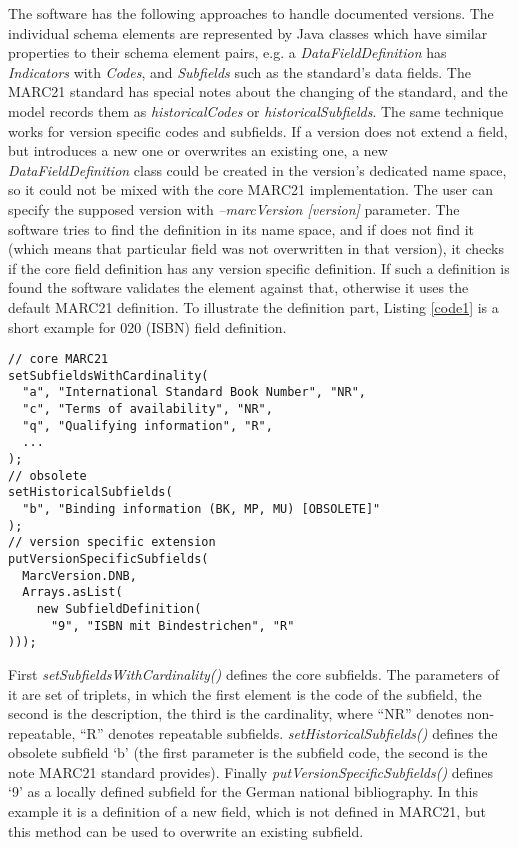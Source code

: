 The software has the following approaches to handle documented versions. The individual schema elements are represented by Java classes which have similar properties to their schema element pairs, e.g. a \emph{DataFieldDefinition} has \emph{Indicators} with \emph{Codes}, and \emph{Subfields} such as the standard's data fields. The MARC21 standard has special notes about the changing of the standard, and the model records them as \emph{historicalCodes} or \emph{historicalSubfields}. The same technique works for version specific codes and subfields. If a version does not extend a field, but introduces a new one or overwrites an existing one, a new \emph{DataFieldDefinition} class could be created in the version's dedicated name space, so it could not be mixed with the core MARC21 implementation. The user can specify the supposed version with \emph{--marcVersion [version]} parameter. The software tries to find the definition in its name space, and if does not find it (which means that particular field was not overwritten in that version), it checks if the core field definition has any version specific definition. If such a definition is found the software validates the element against that, otherwise it uses the default MARC21 definition. To illustrate the definition part, Listing \ref{code1} is a short example for 020 (ISBN) field definition.

\lstset{language=Java, basicstyle=\footnotesize\ttfamily}

\begin{lstlisting}[float, caption=Subfield definition in Java, label=code1]
// core MARC21
setSubfieldsWithCardinality(
  "a", "International Standard Book Number", "NR",
  "c", "Terms of availability", "NR",
  "q", "Qualifying information", "R",
  ...
);
// obsolete
setHistoricalSubfields(
  "b", "Binding information (BK, MP, MU) [OBSOLETE]"
);
// version specific extension
putVersionSpecificSubfields(
  MarcVersion.DNB,
  Arrays.asList(
    new SubfieldDefinition(
      "9", "ISBN mit Bindestrichen", "R"
)));
\end{lstlisting}

First \emph{setSubfieldsWithCardinality()} defines the core subfields. The parameters of it are set of triplets, in which the first element is the code of the subfield, the second is the description, the third is the cardinality, where ``NR'' denotes non-repeatable, ``R'' denotes repeatable subfields. \emph{setHistoricalSubfields()} defines the obsolete subfield `b' (the first parameter is the subfield code, the second is the note MARC21 standard provides). Finally \emph{putVersionSpecificSubfields()} defines `9' as a locally defined subfield for the German national bibliography. In this example it is a definition of a new field, which is not defined in MARC21, but this method can be used to overwrite an existing subfield.

